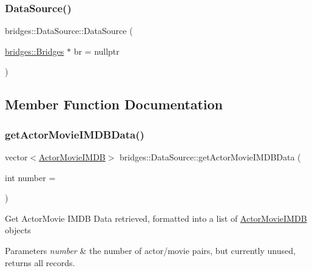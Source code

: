 \subsubsection{\texorpdfstring{Data\+Source()}{DataSource()}}
{\footnotesize\ttfamily bridges\+::\+Data\+Source\+::\+Data\+Source (\begin{DoxyParamCaption}\item[{\mbox{\hyperlink{classbridges_1_1_bridges}{bridges\+::\+Bridges}} $\ast$}]{br = {\ttfamily nullptr} }\end{DoxyParamCaption})\hspace{0.3cm}{\ttfamily [inline]}}



\subsection{Member Function Documentation}
\mbox{\label{classbridges_1_1_data_source_a664694136550312ab3f5a82bebb91bca}} 
\subsubsection{\texorpdfstring{get\+Actor\+Movie\+I\+M\+D\+B\+Data()}{getActorMovieIMDBData()}}
{\footnotesize\ttfamily vector$<$\mbox{\hyperlink{classbridges_1_1_actor_movie_i_m_d_b}{Actor\+Movie\+I\+M\+DB}}$>$ bridges\+::\+Data\+Source\+::get\+Actor\+Movie\+I\+M\+D\+B\+Data (\begin{DoxyParamCaption}\item[{int}]{number = {} }\end{DoxyParamCaption})\hspace{0.3cm}{\ttfamily [inline]}}

Get Actor\+Movie I\+M\+DB Data retrieved, formatted into a list of \mbox{\hyperlink{classbridges_1_1_actor_movie_i_m_d_b}{Actor\+Movie\+I\+M\+DB}} objects


\begin{DoxyParams}{Parameters}
{\em number} & the number of actor/movie pairs, but currently unused, returns all records. \\
\hline
\end{DoxyParams}

